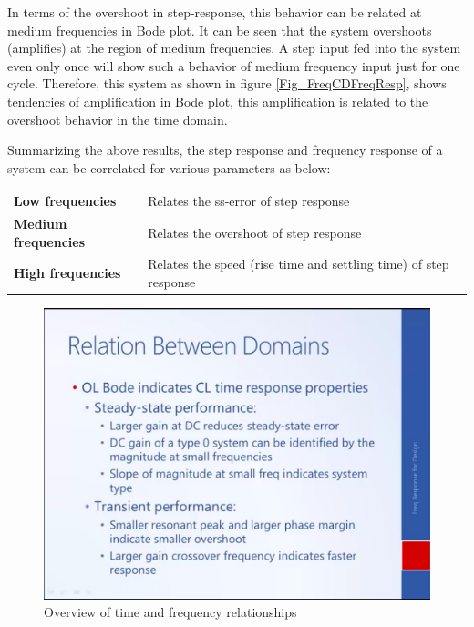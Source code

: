In terms of the overshoot in step-response, this behavior can be related at medium frequencies in Bode plot. It can be seen that the system overshoots (amplifies) at the region of medium frequencies. A step input fed into the system even only once will show such a behavior of medium frequency input just for one cycle. Therefore, this system as shown in figure \ref{Fig_FreqCDFreqResp}, shows tendencies of amplification in Bode plot, this amplification is related to the overshoot behavior in the time domain.

Summarizing the above results, the step response and frequency response of a system can be correlated for various parameters as below:
\begin{table}[h!]
	\centering
	\begin{tabular}{p{5cm} p{8cm}}
		\toprule
		\textbf{Low frequencies} & Relates the ss-error of step response \\
		\cmidrule{1-2}
		\textbf{Medium frequencies} & Relates the overshoot of step response \\
		\cmidrule{1-2}
		\textbf{High frequencies} & Relates the speed (rise time and settling time) of step response \\
		\bottomrule
	\end{tabular}
\end{table}

\begin{figure}[h!]
	\centering
	\includegraphics[width=\linewidth]{Bilder/FreqCDRelationships}
	\caption{Overview of time and frequency relationships}
\end{figure}


